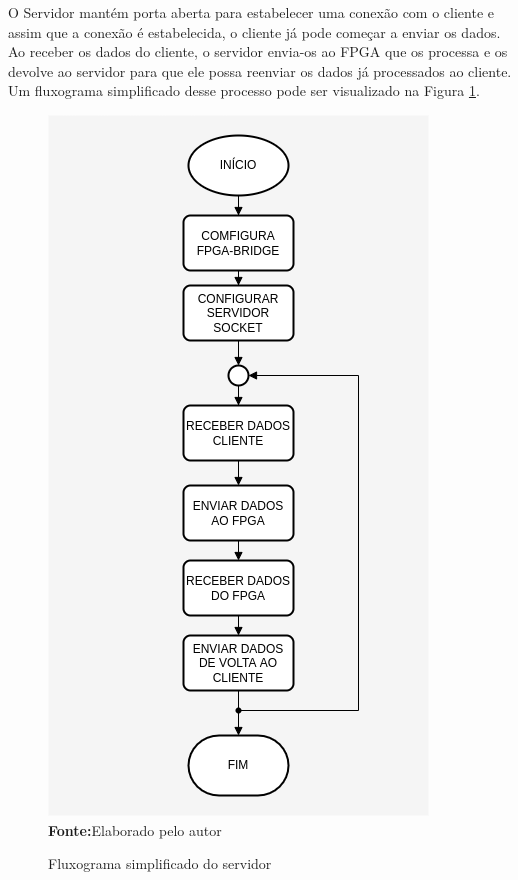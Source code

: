 O Servidor mantém porta aberta para estabelecer uma conexão com o cliente e assim que a conexão é estabelecida, o cliente já pode começar a enviar os dados. Ao receber os dados do cliente, o servidor envia-os ao FPGA que os processa e os devolve ao servidor para que ele possa reenviar os dados já processados ao cliente. Um fluxograma simplificado desse processo pode ser visualizado na Figura \ref{fig:fluxoServidor}.

\begin{figure}[ht]
	\caption{Fluxograma simplificado do servidor}
	\begin{center}
		\includegraphics[scale=0.47]{imagens/fluxogramaServidor.png}\\
		{\small \textbf{Fonte:}Elaborado pelo autor}
    \end{center}\label{fig:fluxoServidor}
\end{figure} 
